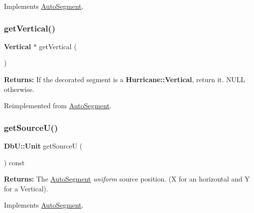 Implements \mbox{\hyperlink{classKatabatic_1_1AutoSegment_a53877ff5ef48eb0030c2581a6eeb3c09}{Auto\+Segment}}.

\mbox{\label{classKatabatic_1_1AutoVertical_ab6a809b6f3ef3cf5385fa35580e31e7a}} 
\subsubsection{\texorpdfstring{get\+Vertical()}{getVertical()}}
{\footnotesize\ttfamily \textbf{ Vertical} $\ast$ get\+Vertical (\begin{DoxyParamCaption}{ }\end{DoxyParamCaption})\hspace{0.3cm}{\ttfamily [virtual]}}

{\bfseries Returns\+:} If the decorated segment is a \textbf{ Hurricane\+::\+Vertical}, return it. {\ttfamily N\+U\+LL} otherwise. 

Reimplemented from \mbox{\hyperlink{classKatabatic_1_1AutoSegment_ab6a809b6f3ef3cf5385fa35580e31e7a}{Auto\+Segment}}.

\mbox{\label{classKatabatic_1_1AutoVertical_ad521ffba761b0e81b7b81b99d62f76f9}} 
\subsubsection{\texorpdfstring{get\+Source\+U()}{getSourceU()}}
{\footnotesize\ttfamily \textbf{ Db\+U\+::\+Unit} get\+SourceU (\begin{DoxyParamCaption}{ }\end{DoxyParamCaption}) const\hspace{0.3cm}{\ttfamily [virtual]}}

{\bfseries Returns\+:} The \mbox{\hyperlink{classKatabatic_1_1AutoSegment}{Auto\+Segment}} {\itshape uniform} source position. (X for an horizontal and Y for a Vertical). 

Implements \mbox{\hyperlink{classKatabatic_1_1AutoSegment_aeaa1543880686755e389c4807128428f}{Auto\+Segment}}.




